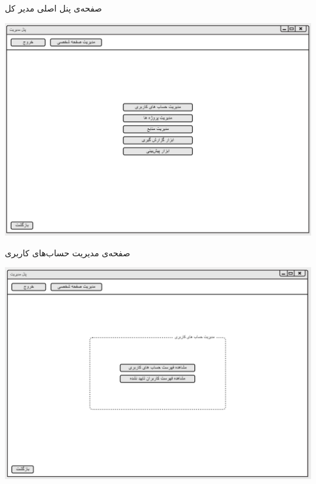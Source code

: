 \vspace{1cm}
صفحه‌ی پنل اصلی مدیر کل
\begin{center}
\includegraphics[width=\textwidth]{Prototype/HeadManager/HeadManagerMainPanel.png}
\end{center}

\newpage
\vspace{1cm}
صفحه‌ی مدیریت حساب‌های کاربری 
\begin{center}
\includegraphics[width=\textwidth]{Prototype/HeadManager/AccountManager.png}
\end{center}

